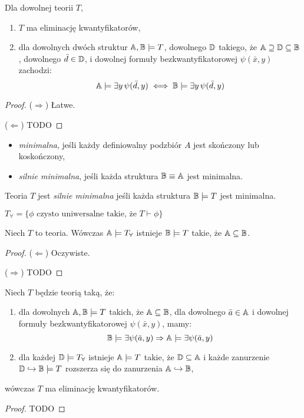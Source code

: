 \documentclass{article}
\begin{document}
\begin{tw}
Dla dowolnej teorii $T$, \fae 
	\begin{enumerate}
		\item $T$ ma eliminację kwantyfikatorów,
		\item dla dowolnych dwóch struktur $\mathbb{A}, \mathbb{B} \models T$, dowolnego $\mathbb{D}$ takiego, że $\mathbb{A} \supseteq \mathbb{D} \subseteq \mathbb{B}$,  dowolnego $\bar{d} \in \mathbb{D}$, i dowolnej formuły bezkwantyfikatorowej $\psi(\bar{x}, y)$  zachodzi:
			\[\mathbb{A} \models \exists y \, \psi(\bar{d}, y) \iff \mathbb{B} \models \exists y \, \psi(\bar{d}, y)\]
	\end{enumerate}
\end{tw}
\begin{proof}
	($\Rightarrow$) Łatwe. 

	($\Leftarrow$) \color{red} TODO
\end{proof}

\begin{df}
	\begin{itemize}
		Struktura $\A$ jest: 
		\item \textit{minimalna}, jeśli każdy definiowalny podzbiór $A$ jest skończony lub koskończony,
		\item \textit{silnie minimalna}, jeśli każda struktura $\mathbb{B} \equiv \mathbb{A}$ jest minimalna. 
	\end{itemize}

	Teoria $T$ jest \textit{silnie minimalna} jeśli każda struktura $\mathbb{B} \models T$ jest minimalna.
\end{df}


\begin{df}
	$T_{\forall} = \{\phi \text{ czysto uniwersalne takie, że } T \vdash 
	\phi\}$
\end{df}

\begin{stw}
	Niech $T$ to teoria.
	Wówczas $\mathbb{A} \models T_{\forall}$ \wtw istnieje $\mathbb{B} \models T$ takie, że $\mathbb{A} \subseteq \mathbb{B}$.
\end{stw}
\begin{proof}
	($\Leftarrow$) Oczywiste.

		($\Rightarrow$) \color{red} TODO
\end{proof}

\begin{tw}
	\label{qe}
	Niech $T$ będzie teorią taką, że:
	\begin{enumerate}
		\item dla dowolnych $\mathbb{A}, \mathbb{B} \models T$ takich, że $\mathbb{A} \subseteq \mathbb{B}$, dla dowolnego $\bar{a} \in \mathbb{A}$ i dowolnej formuły bezkwantyfikatorowej $\psi(\bar{x}, y)$, mamy:
			\[
				\mathbb{B} \models \exists \psi(\bar{a}, y) \Rightarrow \mathbb{A} \models \exists \psi(\bar{a}, y) 
			\]
		\item dla każdej $\mathbb{D} \models T_{\forall}$ istnieje $\mathbb{A} \models T$ takie, że $\mathbb{D} \subseteq \mathbb{A}$ i każde zanurzenie $\mathbb{D} \hookrightarrow \mathbb{B} \models T$ rozszerza się do zanurzenia $\mathbb{A} \hookrightarrow \mathbb{B}$,
	\end{enumerate}
	wówczas $T$ ma eliminację kwantyfikatorów.
\end{tw}
\begin{proof}
	\color{red} TODO
\end{proof}
\end{document}
